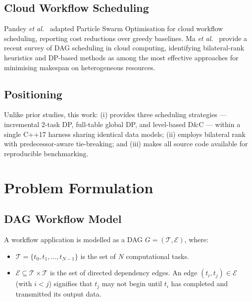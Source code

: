 \documentclass[conference]{IEEEtran}
\begin{document}
\subsection{Cloud Workflow Scheduling}

Pandey \textit{et al.}~\cite{pandey2010particle} adapted Particle
Swarm Optimisation for cloud workflow scheduling, reporting cost
reductions over greedy baselines. Ma \textit{et al.}~\cite{ma2023survey}
provide a recent survey of DAG scheduling in cloud computing,
identifying bilateral-rank heuristics and DP-based methods as among
the most effective approaches for minimising makespan on heterogeneous
resources.

\subsection{Positioning}

Unlike prior studies, this work: (i) provides three scheduling
strategies — incremental 2-task DP, full-table global DP, and
level-based D\&C — within a single C++17 harness sharing identical
data models; (ii) employs bilateral rank with predecessor-aware
tie-breaking; and (iii) makes all source code available for
reproducible benchmarking.

\section{Problem Formulation}
\label{sec:problem}

\subsection{DAG Workflow Model}

A workflow application is modelled as a DAG
$G = (\mathcal{T}, \mathcal{E})$, where:
\begin{itemize}
  \item $\mathcal{T} = \{t_0, t_1, \ldots, t_{N-1}\}$ is the set of
        $N$ computational tasks.
  \item $\mathcal{E} \subseteq \mathcal{T} \times \mathcal{T}$ is the
        set of directed dependency edges. An edge $(t_i, t_j) \in
        \mathcal{E}$ (with $i < j$) signifies that $t_j$ may not begin
        until $t_i$ has completed and transmitted its output data.
\end{itemize}
\end{document}
